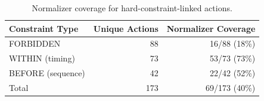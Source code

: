 \begin{table}[t]
\centering
\caption{Normalizer coverage for hard-constraint-linked actions.}
\label{tab:normalizer-audit}
\begin{tabular}{lrr}
\toprule
Constraint Type & Unique Actions & Normalizer Coverage \\
\midrule
FORBIDDEN & 88 & 16/88 (18\%) \\
WITHIN (timing) & 73 & 53/73 (73\%) \\
BEFORE (sequence) & 42 & 22/42 (52\%) \\
\midrule
Total & 173 & 69/173 (40\%) \\
\bottomrule
\end{tabular}
\end{table}
